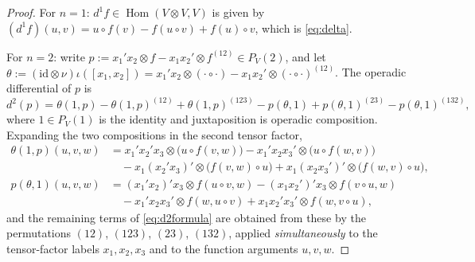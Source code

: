 \documentclass[11pt,reqno]{amsart}
\theoremstyle{plain}
\theoremstyle{definition}
\DeclareMathOperator{\Hom}{Hom}
\begin{document}
\begin{proof}
For $n=1$: $d^1f\in\Hom(V\otimes V,V)$ is given by
$(d^1f)(u,v)=u\circ f(v)-f(u\circ v)+f(u)\circ v$, which is \eqref{eq:delta}.

For $n=2$: write $p:=x_1'x_2\otimes f-x_1x_2'\otimes f^{(12)}\in P_V(2)$, and let
$\theta:=(\mathrm{id}\otimes\nu)\iota([x_1,x_2])=x_1'x_2\otimes(\cdot\circ\cdot)-
x_1x_2'\otimes(\cdot\circ\cdot)^{(12)}$. The operadic differential of $p$ is
\begin{equation}
d^2(p)=\theta(1,p)-\theta(1,p)^{(12)}+\theta(1,p)^{(123)}
-p(\theta,1)+p(\theta,1)^{(23)}-p(\theta,1)^{(132)},
\label{eq:d2formula}
\end{equation}
where $1\in P_V(1)$ is the identity and juxtaposition is operadic composition. Expanding the
two compositions in the second tensor factor,
\begin{align*}
\theta(1,p)(u,v,w)&=x_1'x_2'x_3\otimes\bigl(u\circ f(v,w)\bigr)
-x_1'x_2x_3'\otimes\bigl(u\circ f(w,v)\bigr)\\
&\quad-x_1(x_2'x_3)'\otimes\bigl(f(v,w)\circ u\bigr)+x_1(x_2x_3')'\otimes\bigl(f(w,v)\circ u\bigr),\\
p(\theta,1)(u,v,w)&=(x_1'x_2)'x_3\otimes f(u\circ v,w)-(x_1x_2')'x_3\otimes f(v\circ u,w)\\
&\quad-x_1'x_2x_3'\otimes f(w,u\circ v)+x_1x_2'x_3'\otimes f(w,v\circ u),
\end{align*}
and the remaining terms of \eqref{eq:d2formula} are obtained from these by the permutations
$(12)$, $(123)$, $(23)$, $(132)$, applied \emph{simultaneously} to the tensor-factor labels
$x_1,x_2,x_3$ and to the function arguments $u,v,w$.


\end{proof}
\end{document}
